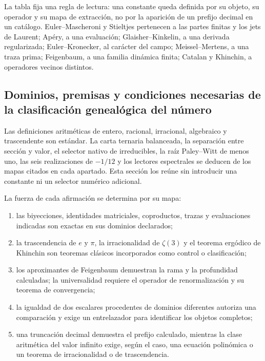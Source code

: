 La tabla fija una regla de lectura: una constante queda definida por su
objeto, su operador y su mapa de extracci\'on, no por la aparici\'on de un
prefijo decimal en un cat\'alogo. Euler--Mascheroni y Stieltjes pertenecen a
las partes finitas y los jets de Laurent; Ap\'ery, a una evaluaci\'on;
Glaisher--Kinkelin, a una derivada regularizada; Euler--Kronecker, al car\'acter
del campo; Meissel--Mertens, a una traza prima; Feigenbaum, a una familia
din\'amica finita; Catalan y Khinchin, a operadores vecinos distintos.

\subsection{Dominios, premisas y condiciones necesarias de la clasificación genealógica del número}

Las definiciones aritm\'eticas de entero, racional, irracional, algebraico y
trascendente son est\'andar. La carta ternaria balanceada, la separaci\'on entre
secci\'on y valor, el selector nativo de irreducibles, la ra\'iz Paley--Witt de
menos uno, las seis realizaciones de \(-1/12\) y los lectores espectrales se
deducen de los mapas citados en cada apartado. Esta secci\'on los reúne sin
introducir una constante ni un selector num\'erico adicional.

La fuerza de cada afirmaci\'on se determina por su mapa:
\begin{enumerate}
\item las biyecciones, identidades matriciales, coproductos, trazas y
      evaluaciones indicadas son exactas en sus dominios declarados;
\item la trascendencia de \(e\) y \(\pi\), la irracionalidad de
      \(\zeta(3)\) y el teorema erg\'odico de Khinchin son teoremas cl\'asicos
      incorporados como control o clasificaci\'on;
\item los aproximantes de Feigenbaum demuestran la rama y la profundidad
      calculadas; la universalidad requiere el operador de renormalizaci\'on y
      su teorema de convergencia;
\item la igualdad de dos escalares procedentes de dominios diferentes
      autoriza una comparaci\'on y exige un entrelazador para identificar los
      objetos completos;
\item una truncaci\'on decimal demuestra el prefijo calculado, mientras la
      clase aritm\'etica del valor infinito exige, según el caso, una ecuación
      polin\'omica o un teorema de irracionalidad o de trascendencia.
\end{enumerate}

